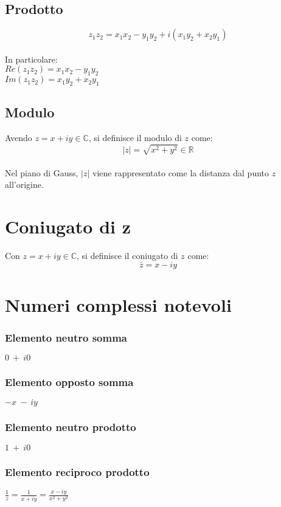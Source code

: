 \subsection{Prodotto}
\begin{equation}
z_1z_2 = x_1x_2-y_1y_2+i(x_1y_2+ x_2y_1)
\end{equation}\\
In particolare:\\
$Re(z_1z_2) = x_1x_2-y_1y_2$\\
$Im(z_1z_2) = x_1y_2 + x_2y_1$
\subsection{Modulo}
Avendo $z = x+iy \in \mathbb{C}$, si definisce il modulo di $z$ come:\\
\begin{equation}
|z| = \sqrt{x^2+y^2} \in \mathbb{R}
\end{equation}\\
Nel piano di Gauss, $|z|$ viene rappresentato come la distanza dal punto $z$ all'origine.

\section{Coniugato di z}
Con $z = x+iy \in \mathbb{C}$, si definisce il coniugato di $z$ come:
\begin{equation}
	\bar{z} = x-iy
\end{equation}

\section{Numeri complessi notevoli}
\subsubsection{Elemento neutro somma}
$0\ +\ i0$
\subsubsection{Elemento opposto somma}
$-x\ -\ iy$
\subsubsection{Elemento neutro prodotto}
$1\ +\ i0$
\subsubsection{Elemento reciproco prodotto}
\begin{Large}
$\frac{1}{z}=\frac{1}{x+iy}=\frac{x-iy}{x^2+y^2}$
\end{Large}


